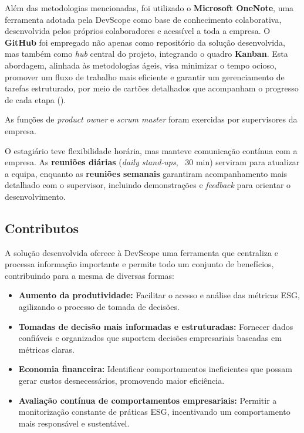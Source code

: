 Além das metodologias mencionadas, foi utilizado o \textbf{Microsoft OneNote}, uma ferramenta adotada pela DevScope como base de conhecimento colaborativa, desenvolvida pelos próprios colaboradores e acessível a toda a empresa. O \textbf{GitHub} foi empregado não apenas como repositório da solução desenvolvida, mas também como \textit{hub} central do projeto, integrando o quadro \textbf{Kanban}. Esta abordagem, alinhada às metodologias ágeis, visa minimizar o tempo ocioso, promover um fluxo de trabalho mais eficiente e garantir um gerenciamento de tarefas estruturado, por meio de cartões detalhados que acompanham o progresso de cada etapa (\cite{Wakode2021Kanban}).

As funções de \textit{product owner} e \textit{scrum master} foram exercidas por supervisores da empresa.

O estagiário teve flexibilidade horária, mas manteve comunicação contínua com a empresa. As \textbf{reuniões diárias} (\textit{daily stand-ups}, ~30 min) serviram para atualizar a equipa, enquanto as \textbf{reuniões semanais} garantiram acompanhamento mais detalhado com o supervisor, incluindo demonstrações e \textit{feedback} para orientar o desenvolvimento.

\subsection{Contributos} 

A solução desenvolvida oferece à DevScope uma ferramenta que centraliza e processa informação importante e permite todo um conjunto de benefícios, contribuindo para a mesma de diversas formas:
\begin{itemize}
  \item \textbf{Aumento da produtividade:} Facilitar o acesso e análise das métricas ESG, agilizando o processo de tomada de decisões.
  \item \textbf{Tomadas de decisão mais informadas e estruturadas:} Fornecer dados confiáveis e organizados que suportem decisões empresariais baseadas em métricas claras.
  \item \textbf{Economia financeira:} Identificar comportamentos ineficientes que possam gerar custos desnecessários, promovendo maior eficiência.
  \item \textbf{Avaliação contínua de comportamentos empresariais:} Permitir a monitorização constante de práticas ESG, incentivando um comportamento mais responsável e sustentável.
\end{itemize}

